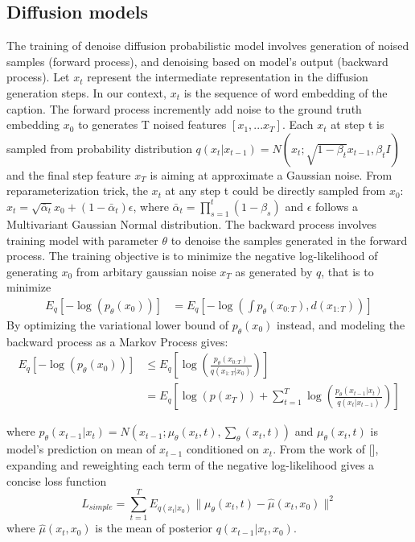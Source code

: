 \documentclass{article}
\begin{document}
\subsection{Diffusion models}
The training of denoise diffusion probabilistic model involves generation of noised samples (forward process), and denoising based on model's output (backward process). Let $x_t$ represent the intermediate representation in the diffusion generation steps. In our context, $x_t$ is the sequence of word embedding of the caption. The forward process incremently add noise to the ground truth embedding $x_0$ to generates T noised features $[x_1, ... x_T]$. Each $x_t$ at step t is sampled from probability distribution $q(x_t | x_{t-1}) = N(x_t; \sqrt{1 - \beta_t}x_{t-1}, \beta_t I)$ and the final step feature $x_T$ is aiming at approximate a Gaussian noise. From reparameterization trick, the $x_t$ at any step t could be directly sampled from $x_0$: $x_t = \sqrt{\bar{\alpha}_t}x_0 + (1 - \bar{\alpha}_t) \epsilon$, where $\bar{\alpha}_t = \prod_{s = 1}^t(1 - \beta_s)$ and $\epsilon$ follows a Multivariant Gaussian Normal distribution. The backward process involves training model with parameter $\theta$ to denoise the samples generated in the forward process. The training objective is to minimize the negative log-likelihood of generating $x_0$ from arbitary gaussian noise $x_T$ as generated by $q$, that is to minimize
\begin{align*}
    E_q[-\log(p_{\theta}(x_0))] &= E_q[-\log(\int p_{\theta}(x_{0:T}), d(x_{1:T}))]
\end{align*}
By optimizing the variational lower bound of $p_{\theta}(x_0)$ instead, and modeling the backward process as a Markov Process gives:
\begin{align*}
    E_q[-\log(p_{\theta}(x_0))] &\leq E_q[\log(\frac{p_{\theta}(x_{0:T})}{q(x_{1:T}| x_0)})] \\
    &= E_q[\log(p(x_T)) + \sum_{t = 1}^T\log(\frac{p_{\theta}(x_{t-1} | x_t)}{q(x_t | x_{t-1})})]
\end{align*}

where $p_{\theta}(x_{t-1} | x_t) = N(x_{t-1}; \mu_{\theta}(x_t, t), \sum_{\theta}(x_t, t))$ and $\mu_{\theta}(x_t, t)$ is model's prediction on mean of $x_{t-1}$ conditioned on $x_t$. From the work of [], expanding and reweighting each term of the negative log-likelihood gives a concise loss function 
$$L_{simple} = \sum_{t=1}^T E_{q(x_t | x_0)} \|\mu_{\theta}(x_t, t) - \hat{\mu}(x_t, x_0)\|^2$$
where $\hat{\mu}(x_t, x_0)$ is the mean of posterior $q(x_{t-1} | x_t, x_0)$.
\end{document}
